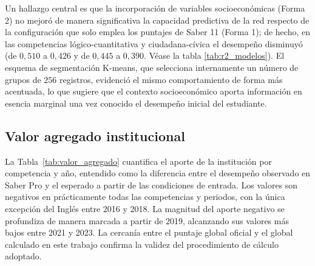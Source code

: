 Un hallazgo central es que la incorporación de variables socioeconómicas (Forma 2) no mejoró de manera significativa la capacidad predictiva de la red respecto de la configuración que solo emplea los puntajes de Saber 11 (Forma 1); de hecho, en las competencias lógico-cuantitativa y ciudadana-cívica el desempeño disminuyó (de $0,510$ a $0,426$ y de $0,445$ a $0,390$. Véase la tabla \ref{tab:r2_modelos}). El esquema de segmentación K-means, que selecciona internamente un número de grupos de $256$ registros, evidenció el mismo comportamiento de forma más acentuada, lo que sugiere que el contexto socioeconómico aporta información en esencia marginal una vez conocido el desempeño inicial del estudiante.

\subsection{Valor agregado institucional}
La Tabla~\ref{tab:valor_agregado} cuantifica el aporte de la institución por competencia y año, entendido como la diferencia entre el desempeño observado en Saber Pro y el esperado a partir de las condiciones de entrada. Los valores son negativos en prácticamente todas las competencias y periodos, con la única excepción del Inglés entre 2016 y 2018. La magnitud del aporte negativo se profundiza de manera marcada a partir de 2019, alcanzando sus valores más bajos entre 2021 y 2023. La cercanía entre el puntaje global oficial y el global calculado en este trabajo confirma la validez del procedimiento de cálculo adoptado.

